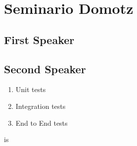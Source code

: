 \chapter{Seminario Domotz}

\section{First Speaker}

\section{Second Speaker}
\begin{enumerate}
   \item Unit tests
   \item Integration tests
   \item End to End tests
\end{enumerate}is